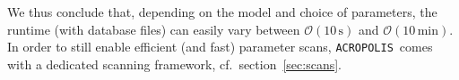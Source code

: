 \documentclass[11pt,a4paper]{article}
\newcommand{\acropolis}{\texttt{ACROPOLIS}~}
\begin{document}
We thus conclude that, depending on the model and choice of parameters, the runtime (with database files) can easily vary between $\mathcal{O}(10\,\mathrm{s})$ and $\mathcal{O}(10\,\mathrm{min})$. In order to still enable efficient (and fast) parameter scans, \acropolis comes with a dedicated scanning framework, cf.\ section~\ref{sec:scans}.



\end{document}
